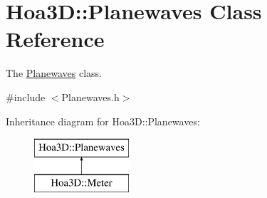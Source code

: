 \hypertarget{class_hoa3_d_1_1_planewaves}{\section{Hoa3\-D\-:\-:Planewaves Class Reference}
\label{class_hoa3_d_1_1_planewaves}
}


The \hyperlink{class_hoa3_d_1_1_planewaves}{Planewaves} class.  




{\ttfamily \#include $<$Planewaves.\-h$>$}

Inheritance diagram for Hoa3\-D\-:\-:Planewaves\-:\begin{figure}[H]
\begin{center}
\leavevmode
\includegraphics[height=2.000000cm]{class_hoa3_d_1_1_planewaves}
\end{center}
\end{figure}
